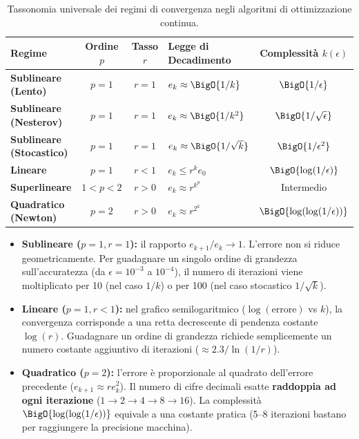 \begin{table}[H]
\centering
\footnotesize
\renewcommand{\arraystretch}{1.3}
\begin{tabularx}{\textwidth}{l c c X c}
\toprule
\textbf{Regime} & \textbf{Ordine $p$} & \textbf{Tasso $r$} & \textbf{Legge di Decadimento} & \textbf{Complessit\`a $k(\epsilon)$} \\
\midrule
\textbf{Sublineare (Lento)}  & $p = 1$ & $r = 1$ & $e_k \approx \BigO{1/k}$          & $\BigO{1/\epsilon}$ \\
\textbf{Sublineare (Nesterov)} & $p = 1$ & $r = 1$ & $e_k \approx \BigO{1/k^2}$        & $\BigO{1/\sqrt{\epsilon}}$ \\
\textbf{Sublineare (Stocastico)} & $p = 1$ & $r = 1$ & $e_k \approx \BigO{1/\sqrt{k}}$ & $\BigO{1/\epsilon^2}$ \\
\textbf{Lineare}             & $p = 1$ & $r < 1$ & $e_k \le r^k e_0$                 & $\BigO{\log(1/\epsilon)}$ \\
\textbf{Superlineare}        & $1 < p < 2$ & $r > 0$ & $e_k \approx r^{k^p}$           & Intermedio \\
\textbf{Quadratico (Newton)} & $p = 2$ & $r > 0$ & $e_k \approx r^{2^k}$             & $\BigO{\log(\log(1/\epsilon))}$ \\
\bottomrule
\end{tabularx}
\caption{Tassonomia universale dei regimi di convergenza negli algoritmi di ottimizzazione continua.}
\label{tab:regimi-convergenza}
\end{table}

\begin{itemize}
    \item \textbf{Sublineare ($p=1, r=1$):} il rapporto $e_{k+1}/e_k \to 1$. L'errore non si riduce geometricamente. Per guadagnare un singolo ordine di grandezza sull'accuratezza (da $\epsilon = 10^{-3}$ a $10^{-4}$), il numero di iterazioni viene moltiplicato per 10 (nel caso $1/k$) o per 100 (nel caso stocastico $1/\sqrt{k}$).
    \item \textbf{Lineare ($p=1, r<1$):} nel grafico semilogaritmico ($\log(\text{errore})$ vs $k$), la convergenza corrisponde a una retta decrescente di pendenza costante $\log(r)$. Guadagnare un ordine di grandezza richiede semplicemente un numero costante aggiuntivo di iterazioni ($\approx 2.3 / \ln(1/r)$).
    \item \textbf{Quadratico ($p=2$):} l'errore \`e proporzionale al quadrato dell'errore precedente ($e_{k+1} \approx r e_k^2$). Il numero di cifre decimali esatte \textbf{raddoppia ad ogni iterazione} ($1 \to 2 \to 4 \to 8 \to 16$). La complessit\`a $\BigO{\log(\log(1/\epsilon))}$ equivale a una costante pratica (5--8 iterazioni bastano per raggiungere la precisione macchina).
\end{itemize}

